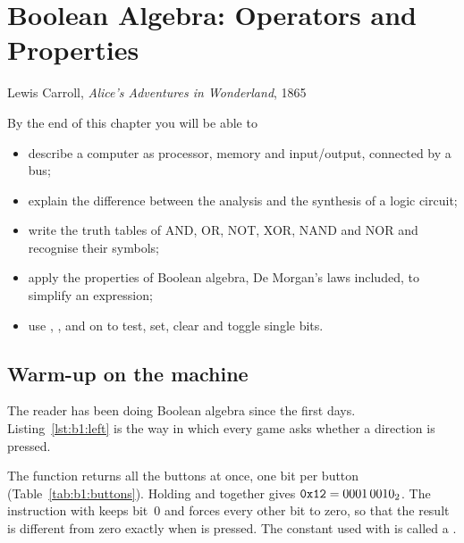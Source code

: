 \chapter{Boolean Algebra: Operators and Properties}
\label{ch:boole1}

  {Lewis Carroll, \emph{Alice's Adventures in Wonderland}, 1865}

\begin{chapgoals}
By the end of this chapter you will be able to
\begin{itemize}
\item describe a computer as processor, memory and input/output, connected by a bus;
\item explain the difference between the analysis and the synthesis of a logic circuit;
\item write the truth tables of AND, OR, NOT, XOR, NAND and NOR and recognise their symbols;
\item apply the properties of Boolean algebra, De Morgan's laws included, to simplify an expression;
\item use , ,  and  on \riscv to test, set, clear and toggle single bits.
\end{itemize}
\end{chapgoals}


\section{Warm-up on the machine}

The reader has been doing Boolean algebra since the first days.
Listing~\ref{lst:b1:left} is the way in which every \prg game asks whether a
direction is pressed.


The function  returns all the buttons at once, one
bit per button (Table~\ref{tab:b1:buttons}). Holding  and 
together gives $\texttt{0x12} = 0001\,0010_2$. The instruction  with
 keeps bit~0 and forces every other bit to zero, so that the result is
different from zero exactly when  is pressed. The constant used
with  is called a .

